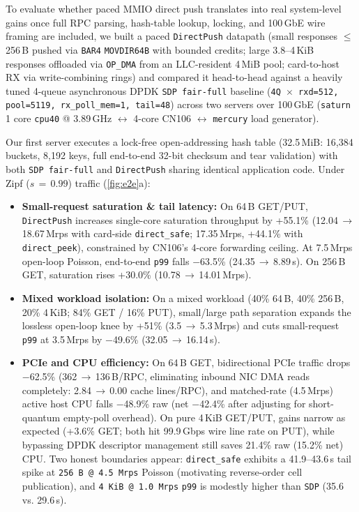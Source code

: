 To evaluate whether paced MMIO direct push translates into real system-level gains once full RPC parsing, hash-table lookup, locking, and 100\,GbE wire framing are included, we built a paced \texttt{DirectPush} datapath (small responses $\le$\,256\,B pushed via \texttt{BAR4} \texttt{MOVDIR64B} with bounded credits; large 3.8--4\,KiB responses offloaded via \texttt{OP\_DMA} from an LLC-resident 4\,MiB pool; card-to-host RX via write-combining rings) and compared it head-to-head against a heavily tuned 4-queue asynchronous DPDK \texttt{SDP fair-full} baseline (\texttt{4Q\,$\times$\,rxd=512, pool=5119, rx\_poll\_mem=1, tail=48}) across two servers over 100\,GbE (\texttt{saturn} 1 core \texttt{cpu40} @ 3.89\,GHz $\leftrightarrow$ 4-core CN106 $\leftrightarrow$ \texttt{mercury} load generator).

Our first server executes a lock-free open-addressing hash table (32.5\,MiB: 16,384 buckets, 8,192 keys, full end-to-end 32-bit checksum and tear validation) with both \texttt{SDP fair-full} and \texttt{DirectPush} sharing identical application code. Under Zipf ($s\,=\,0.99$) traffic (\autoref{fig:e2e}a):
\begin{itemize}
  \item \textbf{Small-request saturation \& tail latency:} On 64\,B GET/PUT, \texttt{DirectPush} increases single-core saturation throughput by +55.1\% (12.04\,$\to$\,18.67\,Mrps with card-side \texttt{direct\_safe}; 17.35\,Mrps, +44.1\% with \texttt{direct\_peek}), constrained by CN106's 4-core forwarding ceiling. At 7.5\,Mrps open-loop Poisson, end-to-end \texttt{p99} falls $-$63.5\% (24.35\,$\to$\,8.89\,\textmu s). On 256\,B GET, saturation rises +30.0\% (10.78\,$\to$\,14.01\,Mrps).
  \item \textbf{Mixed workload isolation:} On a mixed workload (40\% 64\,B, 40\% 256\,B, 20\% 4\,KiB; 84\% GET / 16\% PUT), small/large path separation expands the lossless open-loop knee by +51\% (3.5\,$\to$\,5.3\,Mrps) and cuts small-request \texttt{p99} at 3.5\,Mrps by $-$49.6\% (32.05\,$\to$\,16.14\,\textmu s).
  \item \textbf{PCIe and CPU efficiency:} On 64\,B GET, bidirectional PCIe traffic drops $-$62.5\% (362\,$\to$\,136\,B/RPC, eliminating inbound NIC DMA reads completely: 2.84\,$\to$\,0.00 cache lines/RPC), and matched-rate (4.5\,Mrps) active host CPU falls $-$48.9\% raw (net $-$42.4\% after adjusting for short-quantum empty-poll overhead). On pure 4\,KiB GET/PUT, gains narrow as expected (+3.6\% GET; both hit 99.9\,Gbps wire line rate on PUT), while bypassing DPDK descriptor management still saves 21.4\% raw (15.2\% net) CPU. Two honest boundaries appear: \texttt{direct\_safe} exhibits a 41.9--43.6\,\textmu s tail spike at \texttt{256\,B @ 4.5\,Mrps} Poisson (motivating reverse-order cell publication), and \texttt{4\,KiB @ 1.0\,Mrps} \texttt{p99} is modestly higher than \texttt{SDP} (35.6 vs. 29.6\,\textmu s).
\end{itemize}

